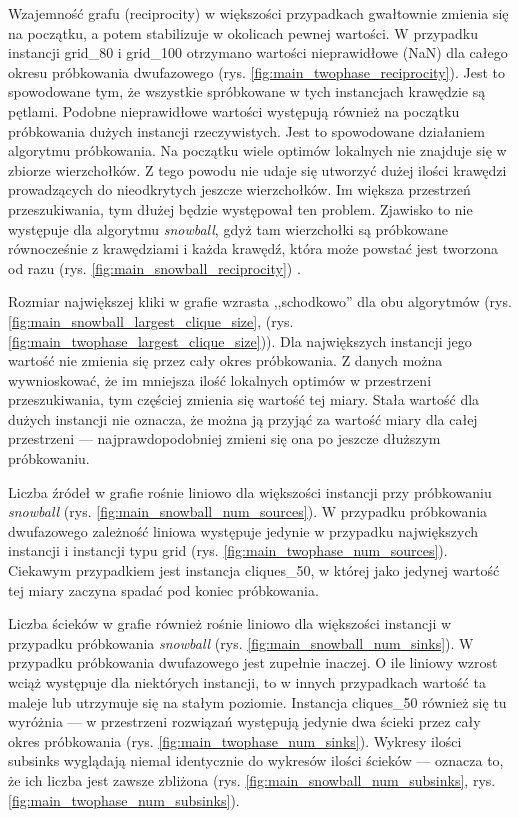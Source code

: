 Wzajemność grafu (reciprocity) w większości przypadkach gwałtownie zmienia się na początku, a potem stabilizuje w okolicach pewnej wartości.
W przypadku instancji grid\_80 i grid\_100 otrzymano wartości nieprawidłowe (NaN) dla całego okresu próbkowania dwufazowego (rys. \ref{fig:main_twophase_reciprocity}).
Jest to spowodowane tym, że wszystkie spróbkowane w tych instancjach krawędzie są pętlami.
Podobne nieprawidłowe wartości występują również na początku próbkowania dużych instancji rzeczywistych.
Jest to spowodowane działaniem algorytmu próbkowania. Na początku wiele optimów lokalnych nie znajduje się w zbiorze wierzchołków.
Z tego powodu nie udaje się utworzyć dużej ilości krawędzi prowadzących do nieodkrytych jeszcze wierzchołków.
Im większa przestrzeń przeszukiwania, tym dłużej będzie występował ten problem.
Zjawisko to nie występuje dla algorytmu \textit{snowball}, gdyż tam wierzchołki są próbkowane równocześnie z krawędziami i każda krawędź, która może powstać jest
tworzona od razu (rys. \ref{fig:main_snowball_reciprocity}) .

Rozmiar największej kliki w grafie wzrasta ,,schodkowo'' dla obu algorytmów (rys. \ref{fig:main_snowball_largest_clique_size}, (rys. \ref{fig:main_twophase_largest_clique_size})).
Dla największych instancji jego wartość nie zmienia się przez cały okres próbkowania.
Z danych można wywnioskować, że im mniejsza ilość lokalnych optimów w przestrzeni przeszukiwania, tym częściej zmienia się wartość tej miary.
Stała wartość dla dużych instancji nie oznacza, że można ją przyjąć za wartość miary dla całej przestrzeni --- najprawdopodobniej zmieni się
ona po jeszcze dłuższym próbkowaniu.

Liczba źródeł w grafie rośnie liniowo dla większości instancji przy próbkowaniu \textit{snowball} (rys. \ref{fig:main_snowball_num_sources}).
W przypadku próbkowania dwufazowego zależność liniowa występuje jedynie w przypadku największych instancji i instancji typu grid (rys. \ref{fig:main_twophase_num_sources}).
Ciekawym przypadkiem jest instancja cliques\_50, w której jako jedynej wartość tej miary zaczyna spadać pod koniec próbkowania.

Liczba ścieków w grafie również rośnie liniowo dla większości instancji w przypadku próbkowania \textit{snowball} (rys. \ref{fig:main_snowball_num_sinks}).
W przypadku próbkowania dwufazowego jest zupełnie inaczej. O ile liniowy wzrost wciąż występuje dla niektórych instancji, to w innych przypadkach
wartość ta maleje lub utrzymuje się na stałym poziomie. Instancja cliques\_50 również się tu wyróżnia --- w przestrzeni rozwiązań występują jedynie dwa ścieki
przez cały okres próbkowania (rys. \ref{fig:main_twophase_num_sinks}).
Wykresy ilości subsinks wyglądają niemal identycznie do wykresów ilości ścieków --- oznacza to, że ich liczba jest zawsze zbliżona
(rys. \ref{fig:main_snowball_num_subsinks}, rys. \ref{fig:main_twophase_num_subsinks}).

